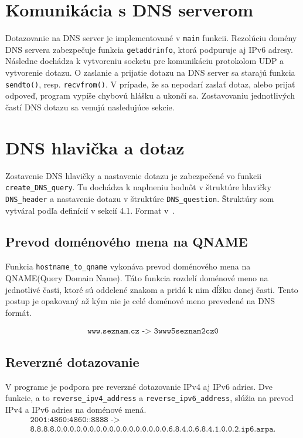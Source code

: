 \section{Komunikácia s DNS serverom}
Dotazovanie na DNS server je implementované v \texttt{main} funkcii. Rezolúciu domény DNS servera zabezpečuje funkcia \texttt{getaddrinfo}, ktorá podpuruje aj IPv6 adresy. Následne dochádza k vytvoreniu socketu pre komunikáciu protokolom UDP a vytvorenie dotazu. O zaslanie a prijatie dotazu na DNS server sa starajú funkcia \texttt{sendto()}, resp. \texttt{recvfrom()}. V prípade, že sa nepodarí zaslať dotaz, alebo prijať odpoveď, program vypíše chybovú hlášku a ukončí sa.
Zostavovaniu jednotlivých častí DNS dotazu sa venujú nasledujúce sekcie.

\section{DNS hlavička a dotaz}
Zostavenie DNS hlavičky a nastavenie dotazu je zabezpečené vo funkcii \texttt{create\_DNS\_query}. Tu dochádza k naplneniu hodnôt v štruktúre hlavičky \texttt{DNS\_header} a nastavenie dotazu v štruktúre \texttt{DNS\_question}. Štruktúry som vytváral podľa definícií v sekcií 4.1. Format v~\cite{RFC1035}.

\subsection{Prevod doménového mena na QNAME}
Funkcia \texttt{hostname\_to\_qname} vykonáva prevod doménového mena na QNAME(Query Domain Name). Táto funkcia rozdelí doménové meno na jednotlivé časti, ktoré sú oddelené znakom  a pridá k nim dĺžku danej časti. Tento postup je opakovaný až kým nie je celé doménové meno prevedené na DNS formát.

\begin{gather*}
    \texttt{www.seznam.cz -> 3www5seznam2cz0}
\end{gather*}

\subsection{Reverzné dotazovanie}
V programe je podpora pre reverzné dotazovanie IPv4 aj IPv6 adries. Dve funkcie, a to \texttt{reverse\_ipv4\_address} a \texttt{reverse\_ipv6\_address}, slúžia na prevod IPv4 a IPv6 adries na doménové mená. 
\begin{gather*}
    \texttt{2001:4860:4860::8888 -> } \\ \texttt{8.8.8.8.0.0.0.0.0.0.0.0.0.0.0.0.0.0.0.0.0.6.8.4.0.6.8.4.1.0.0.2.ip6.arpa.}
\end{gather*}

